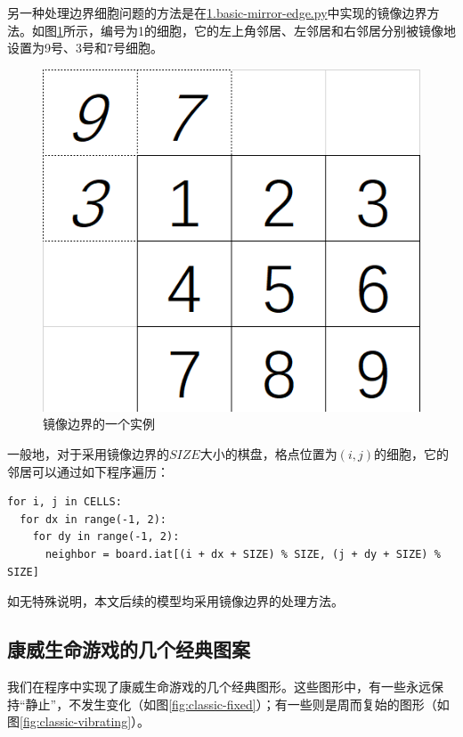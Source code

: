 \documentclass{ctexart}
\begin{document}
另一种处理边界细胞问题的方法是在\underline{1.basic-mirror-edge.py}中实现的镜像边界方法。如图\ref{fig:mirror-edge-example}所示，编号为1的细胞，它的左上角邻居、左邻居和右邻居分别被镜像地设置为9号、3号和7号细胞。

\begin{figure}[ht]
  \centering
  \includegraphics[scale=0.6]{mirror-edge-example.png}
  \caption{镜像边界的一个实例}
  \label{fig:mirror-edge-example}
\end{figure}

一般地，对于采用镜像边界的$SIZE$大小的棋盘，格点位置为$(i, j)$的细胞，它的邻居可以通过如下程序遍历：

\begin{lstlisting}[style = python]
for i, j in CELLS:
  for dx in range(-1, 2):
    for dy in range(-1, 2):
      neighbor = board.iat[(i + dx + SIZE) % SIZE, (j + dy + SIZE) % SIZE]
\end{lstlisting}

如无特殊说明，本文后续的模型均采用镜像边界的处理方法。

\subsection{康威生命游戏的几个经典图案}

我们在程序中实现了康威生命游戏的几个经典图形。这些图形中，有一些永远保持“静止”，不发生变化（如图\ref{fig:classic-fixed}）；有一些则是周而复始的图形（如图\ref{fig:classic-vibrating}）。
\end{document}
